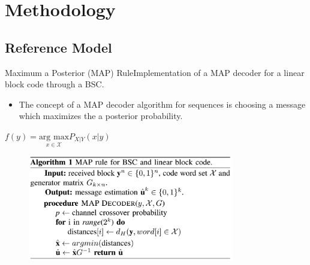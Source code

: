 \documentclass{beamer}
\begin{document}


\section{Methodology}

\subsection{Reference Model}
\begin{frame}{Maximum a Posterior (MAP) Rule}{Implementation of a MAP decoder for a linear block code through a BSC.}

\begin{itemize}
\item{The concept of a MAP decoder algorithm for sequences is choosing a message which maximizes the a posterior probability.}
\end{itemize}

\begin{center}
$f(y) = \underset{x\in \mathcal{X}}{\text{arg max}} P_{X|Y}(x|y)$
\end{center}

 \begin{figure}[!ht]
  \centering
    \includegraphics[width=0.8\textwidth]{images/algorithm}
\end{figure}

\end{frame}
\end{document}
